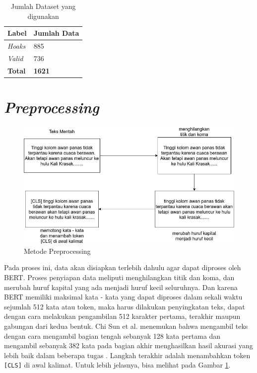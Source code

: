 \begin{table}
  \caption{Jumlah Dataset yang digunakan}
  \label{tab:dataset}
  \centering
  \begin{tabular}{ | l | l | }
    \hline
    \textbf{Label} & \textbf{Jumlah Data} \\ \hline
    \textit{Hoaks} & 885                  \\ \hline
    \textit{Valid} & 736                  \\ \hline
    \textbf{Total} & \textbf{1621}        \\ \hline
  \end{tabular}
\end{table}

\section{\textit{Preprocessing}}

\begin{figure}[h!]
  \begin{center}
    \includegraphics[width= \linewidth]{gambar/preprocess.png}
    \caption{Metode Preprocessing}
    \label{fig: metodologi_preprocessing}
  \end{center}
\end{figure}

Pada proses ini, data akan disiapkan terlebih dahulu agar dapat diproses oleh BERT. Proses penyiapan data meliputi menghilangkan titik dan koma, dan merubah huruf kapital yang ada menjadi huruf kecil seluruhnya. Dan karena BERT memiliki maksimal kata - kata yang dapat diproses dalam sekali waktu sejumlah 512 kata atau token, maka harus dilakukan penyingkatan teks, dapat dengan cara melakukan pengambilan 512 karakter pertama, terakhir maupun gabungan dari kedua bentuk. Chi Sun et al. menemukan bahwa mengambil teks dengan cara mengambil bagian tengah sebanyak 128 kata pertama dan mengambil sebanyak 382 kata pada bagian akhir menghasilkan hasil akurasi yang lebih baik dalam beberapa tugas \cite{sun2019fine}. Langkah terakhir adalah menambahkan token \texttt{[CLS]} di awal kalimat. Untuk lebih jelasnya, bisa melihat pada Gambar \ref{fig: metodologi_preprocessing}.

